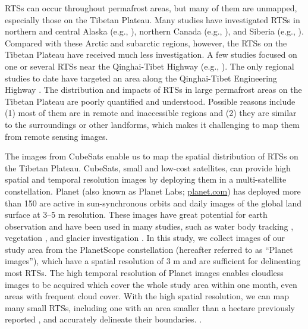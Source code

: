 \documentclass[authoryear,preprint,review,12pt]{elsarticle}
\begin{document}
RTSs can occur throughout permafrost areas, but many of them are unmapped, especially those on the Tibetan Plateau. Many studies have investigated RTSs in northern and central Alaska (e.g., \citealp{swanson2018growth,balser2014timing}), northern Canada (e.g., \citealp{burn1990canadian, cassidy2017impacts, armstrong2018thaw,lewkowicz2019extremes}), and Siberia (e.g., \citealp{leibman2003dynamics, zwieback2018sub}). %
Compared with these Arctic and subarctic regions, however, the RTSs on the Tibetan Plateau have received much less investigation. 
A few studies focused on one or several RTSs near the Qinghai-Tibet Highway (e.g., \citealp{wang1995situ,sun2017creep}). The only regional studies to date have targeted an area along the Qinghai-Tibet Engineering Highway \citep{niu2014thaw, niu2016thaw}. 
The distribution and impacts of RTSs in large permafrost areas on the Tibetan Plateau are poorly quantified and understood. 
Possible reasons include (1) most of them are in remote and inaccessible regions and (2) they are similar to the surroundings or other landforms, which makes it challenging to map them from remote sensing images.

The images from CubeSats enable us to map the spatial distribution of RTSs on the Tibetan Plateau. CubeSats, small and low-cost satellites, can provide high spatial and temporal resolution images by deploying them in a multi-satellite constellation.  Planet (also known as Planet Labs; \url{planet.com}) has deployed  more than 150  are active in sun-synchronous orbits and  daily images of the global land surface at 3--5 m resolution. These images have great potential for earth observation and have been used in many studies, such as water body tracking \citep{cooley2017tracking, cooley2019arctic, aragon2018cubesats, miles2018glacial}, vegetation \citep{houborg2016high, houborg2018daily}, and glacier investigation \citep{altena2017glacier}. In this study, we collect images of our study area from the PlanetScope constellation (hereafter referred to as “Planet images”), which have a spatial resolution of 3 m and are sufficient for delineating most RTSs. The high temporal resolution of Planet images enables cloudless images to be acquired which cover the whole study area within one month, even  areas with frequent cloud cover. With the high spatial resolution, we can map many small RTSs, including one with an area smaller than a hectare previously reported \cite{niu2012development,niu2016thaw}, and accurately delineate their boundaries. . %
\end{document}
